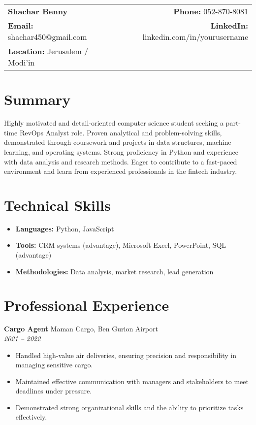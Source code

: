 \documentclass[a4paper,10pt]{article}
\makeatletter
\renewcommand{\maketitle}{
    \hspace{-1em}\begin{tabular*}{\textwidth}{l@{\extracolsep{\fill}}r}
        \textbf{\LARGE Shachar Benny} & \textbf{Phone:} 052-870-8081 \\
        \textbf{Email:} shachar450@gmail.com & \textbf{LinkedIn:} linkedin.com/in/yourusername \\
        \textbf{Location:} Jerusalem / Modi'in & \\
    \end{tabular*}
    \vspace{1em}
}
\makeatother
\begin{document}
\maketitle

\section*{Summary}
Highly motivated and detail-oriented computer science student seeking a part-time RevOps Analyst role. Proven analytical and problem-solving skills, demonstrated through coursework and projects in data structures, machine learning, and operating systems.  Strong proficiency in Python and experience with  data analysis and research methods.  Eager to contribute to a fast-paced environment and learn from experienced professionals in the fintech industry. 

\section*{Technical Skills}
\begin{itemize}[noitemsep,nolistsep]
    \item \textbf{Languages:} Python, JavaScript
    \item \textbf{Tools:} CRM systems (advantage), Microsoft Excel, PowerPoint, SQL (advantage)
    \item \textbf{Methodologies:} Data analysis, market research, lead generation
\end{itemize}

\section*{Professional Experience}
\textbf{Cargo Agent} \hfill Maman Cargo, Ben Gurion Airport \\
\textit{2021 -- 2022}
\begin{itemize}[noitemsep,nolistsep]
    \item Handled high-value air deliveries, ensuring precision and responsibility in managing sensitive cargo.
    \item Maintained effective communication with managers and stakeholders to meet deadlines under pressure.
    \item Demonstrated strong organizational skills and the ability to prioritize tasks effectively. 
\end{itemize}

\end{document}
